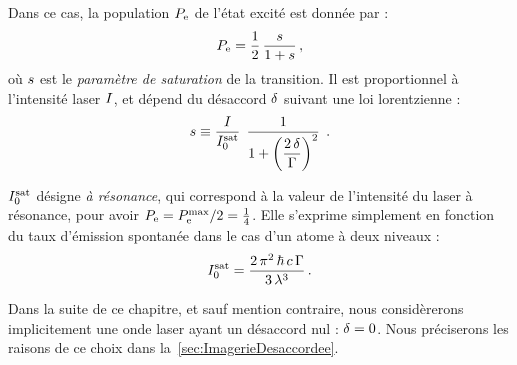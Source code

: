 \noindent Dans ce cas, la population ${P_{\rm e}}$ de l'état excité est donnée par %
%
:
\begin{equation}
	\PopuE = \frac{1}{2}\,\frac{\sat}{1+\sat}
	\virguleformule
	\label{eq:PopuEParamSat}
\end{equation}
où ${s}$ est le \emph{paramètre de saturation} de la transition. Il est proportionnel à l'intensité laser ${I}$, et dépend du désaccord ${\delta}$ suivant une loi lorentzienne %
%
:
\begin{equation}
	\sat \equiv \IsurIsat  
	\, \left. \frac{1}{ 1 + \left(\dfrac{2\,\desac}{\pulsSpont}\right)^2 } \right. 
	\pointformule
	\label{eq:ParamSat}
\end{equation}

\casse

{\AjouteLigne}

\noindent
${I^{\rm sat}_{0}}$ désigne \emph{\lintsat à résonance}, qui correspond à la valeur de l'intensité du laser à résonance, pour avoir ${P_{\rm e}} = {{{P_{\rm e}^{\rm max}}} / {2}} = \tfrac{1}{4}$. 
Elle s'exprime simplement en fonction du taux d'émission spontanée dans le cas d'un atome à deux niveaux %
%
:
\begin{equation}
	\Isat = \frac{2\,\pi^2\,\hbar\,c\,\pulsSpont}{3\,\lambda^3}
	\pointformule
	\label{eq:IsatExpr}
\end{equation}

Dans la suite de ce chapitre, et sauf mention contraire, nous considèrerons implicitement une onde laser ayant un désaccord nul : ${\delta}=0$. Nous préciserons les raisons de ce choix dans la~\autoref{sec:ImagerieDesaccordee}.


